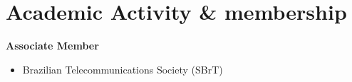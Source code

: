 \section{Academic Activity \& membership}

\textbf{Associate Member}
\begin{itemize}[leftmargin=1.5cm, label={-}]
    \item Brazilian Telecommunications Society (SBrT)
\end{itemize}